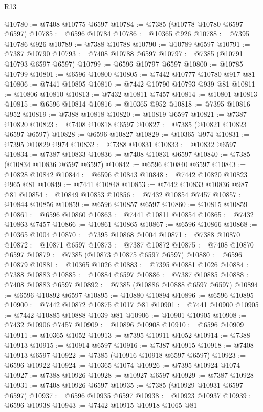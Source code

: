 \begin{lexlean}{R13}
\begin{coremodule}
@10780 := @7408 @10775 @6597
@10784 := @7385 (@10778 @10780 @6597 @6597)
@10785 := @6596 @10784
@10786 := @10365 @926
@10788 := @7395 @10786 @926
@10789 := @7388 @10788
@10790 := @10789 @6597
@10791 := @7387 @10790
@10793 := @7408 @10788 @6597
@10797 := @7385 (@10791 @10793 @6597 @6597)
@10799 := @6596 @10797 @6597
@10800 := @10785 @10799
@10801 := @6596 @10800
@10805 := @7442 @10777 @10780 @917 @81
@10806 := @7441 @10805
@10810 := @7442 @10790 @10793 @939 @81
@10811 := @10806 @10810
@10813 := @7432 @10811 @7457
@10814 := @10801 @10813
@10815 := @6596 @10814
@10816 := @10365 @952
@10818 := @7395 @10816 @952
@10819 := @7388 @10818
@10820 := @10819 @6597
@10821 := @7387 @10820
@10823 := @7408 @10818 @6597
@10827 := @7385 (@10821 @10823 @6597 @6597)
@10828 := @6596 @10827
@10829 := @10365 @974
@10831 := @7395 @10829 @974
@10832 := @7388 @10831
@10833 := @10832 @6597
@10834 := @7387 @10833
@10836 := @7408 @10831 @6597
@10840 := @7385 (@10834 @10836 @6597 @6597)
@10842 := @6596 @10840 @6597
@10843 := @10828 @10842
@10844 := @6596 @10843
@10848 := @7442 @10820 @10823 @965 @81
@10849 := @7441 @10848
@10853 := @7442 @10833 @10836 @987 @81
@10854 := @10849 @10853
@10856 := @7432 @10854 @7457
@10857 := @10844 @10856
@10859 := @6596 @10857 @6597
@10860 := @10815 @10859
@10861 := @6596 @10860
@10863 := @7441 @10811 @10854
@10865 := @7432 @10863 @7457
@10866 := @10861 @10865
@10867 := @6596 @10866
@10868 := @10365 @1004
@10870 := @7395 @10868 @1004
@10871 := @7388 @10870
@10872 := @10871 @6597
@10873 := @7387 @10872
@10875 := @7408 @10870 @6597
@10879 := @7385 (@10873 @10875 @6597 @6597)
@10880 := @6596 @10879
@10881 := @10365 @1026
@10883 := @7395 @10881 @1026
@10884 := @7388 @10883
@10885 := @10884 @6597
@10886 := @7387 @10885
@10888 := @7408 @10883 @6597
@10892 := @7385 (@10886 @10888 @6597 @6597)
@10894 := @6596 @10892 @6597
@10895 := @10880 @10894
@10896 := @6596 @10895
@10900 := @7442 @10872 @10875 @1017 @81
@10901 := @7441 @10900
@10905 := @7442 @10885 @10888 @1039 @81
@10906 := @10901 @10905
@10908 := @7432 @10906 @7457
@10909 := @10896 @10908
@10910 := @6596 @10909
@10911 := @10365 @1052
@10913 := @7395 @10911 @1052
@10914 := @7388 @10913
@10915 := @10914 @6597
@10916 := @7387 @10915
@10918 := @7408 @10913 @6597
@10922 := @7385 (@10916 @10918 @6597 @6597)
@10923 := @6596 @10922
@10924 := @10365 @1074
@10926 := @7395 @10924 @1074
@10927 := @7388 @10926
@10928 := @10927 @6597
@10929 := @7387 @10928
@10931 := @7408 @10926 @6597
@10935 := @7385 (@10929 @10931 @6597 @6597)
@10937 := @6596 @10935 @6597
@10938 := @10923 @10937
@10939 := @6596 @10938
@10943 := @7442 @10915 @10918 @1065 @81

\end{coremodule}
\end{lexlean}
